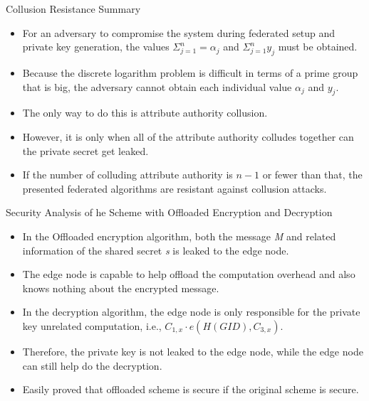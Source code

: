 \documentclass[11pt]{beamer}
\begin{document}
\begin{frame}{Collusion Resistance Summary}

\begin{itemize}
\item For an adversary to compromise the system during federated setup and private key generation, the values $\Sigma_{j = 1}^n=\alpha_j$ and $\Sigma_{j = 1}^n y_j$ must be obtained.
\item Because the discrete logarithm problem is difficult in terms of a prime group that is big, the adversary cannot obtain each individual value $\alpha_j$ and $y_j$.
\item The only way to do this is attribute authority collusion.
\item However, it is only when all of the attribute authority colludes together can the private secret get leaked.
\item If the number of colluding attribute authority is $n - 1$ or fewer than that, the presented federated algorithms are resistant against collusion attacks.
\end{itemize}

\end{frame}

\begin{frame}[allowframebreaks]{Security Analysis of he Scheme with Offloaded Encryption and Decryption}
\begin{itemize}
\item In the Offloaded encryption algorithm, both the message \textit{M} and related information of the shared secret \textit{s} is leaked to the edge node.
\item The edge node is capable to help offload the computation overhead and also knows nothing about the encrypted message.
\item In the decryption algorithm, the edge node is only responsible for the private key unrelated computation, i.e., $C_{1,x}\cdot e(H(GID),C_{3,x})$.
\item Therefore, the private key is not leaked to the edge node, while the edge node can still help do the decryption.
\item Easily proved that offloaded scheme is secure if the original scheme is secure.

\end{itemize}
\end{frame}
\end{document}
